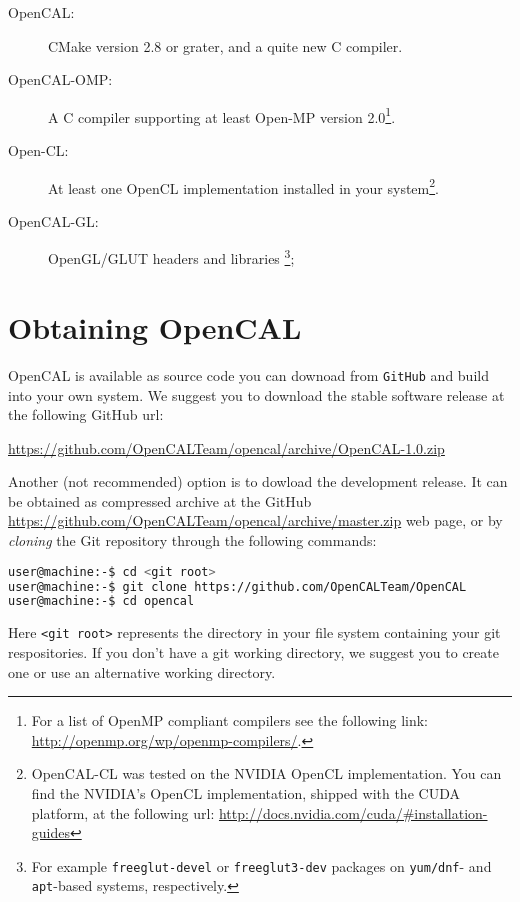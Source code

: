 \begin{description}
\item[OpenCAL: ] CMake version 2.8 or grater, and a quite new C
  compiler.
\item[OpenCAL-OMP: ] A C compiler supporting at least Open-MP version
  2.0\footnote{For a list of OpenMP compliant compilers see the
    following link: \url{http://openmp.org/wp/openmp-compilers/}.}.
\item[Open-CL: ] At least one OpenCL implementation installed in your
  system\footnote{OpenCAL-CL was tested on the NVIDIA OpenCL
    implementation. You can find the NVIDIA's OpenCL implementation,
    shipped with the CUDA platform, at the following url:
    \url{http://docs.nvidia.com/cuda/\#installation-guides}}.
\item[OpenCAL-GL: ] OpenGL/GLUT headers and libraries \footnote{For
  example \texttt{freeglut-devel} or \texttt{freeglut3-dev} packages
  on \texttt{yum/dnf}- and \texttt{apt}-based systems, respectively.};
\end{description}


\section{Obtaining OpenCAL}

OpenCAL is available as source code you can downoad from \verb'GitHub'
and build into your own system. We suggest you to download the stable
software release at the following GitHub url:

\vspace{0.3cm}
\begin{center}
\url{https://github.com/OpenCALTeam/opencal/archive/OpenCAL-1.0.zip}
\end{center}
\vspace{0.3cm}

\noindent Another (not recommended) option is to dowload the
development release. It can be obtained as compressed archive at the
GitHub \url{https://github.com/OpenCALTeam/opencal/archive/master.zip}
web page, or by \emph{cloning} the Git repository through the
following commands:

\begin{lstlisting}[numbers=none,language=bash]
user@machine:-$ cd <git root>
user@machine:-$ git clone https://github.com/OpenCALTeam/OpenCAL
user@machine:-$ cd opencal
\end{lstlisting}

\noindent Here \verb'<git root>' represents the directory in your file system
containing your git respositories. If you don't have a git working
directory, we suggest you to create one or use an alternative working
directory.


